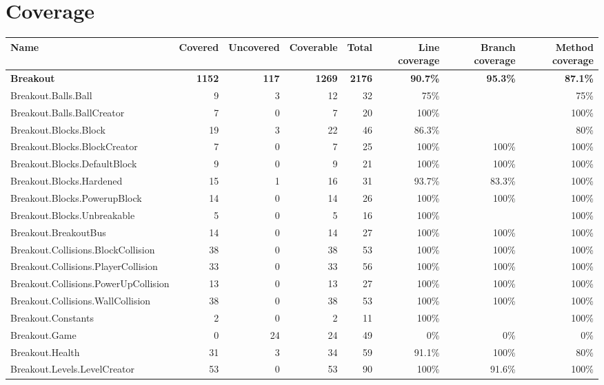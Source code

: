 \documentclass[a4paper,landscape,10pt]{article}
\begin{document}
\section{Coverage}
\begin{longtable}[l]{|l|r|r|r|r|r|r|r|}
\hline
\textbf{Name} & \textbf{Covered} & \textbf{Uncovered} & \textbf{Coverable} & \textbf{Total} & \textbf{Line coverage} & \textbf{Branch coverage} & \textbf{Method coverage}\\
\hline
\textbf{Breakout} & \textbf{1152} & \textbf{117} & \textbf{1269} & \textbf{2176} & \textbf{90.7\%} & \textbf{95.3\%} & \textbf{87.1\%}\\
\hline
Breakout.Balls.Ball & 9 & 3 & 12 & 32 & 75\% &  & 75\%\\
\hline
Breakout.Balls.BallCreator & 7 & 0 & 7 & 20 & 100\% &  & 100\%\\
\hline
Breakout.Blocks.Block & 19 & 3 & 22 & 46 & 86.3\% &  & 80\%\\
\hline
Breakout.Blocks.BlockCreator & 7 & 0 & 7 & 25 & 100\% & 100\% & 100\%\\
\hline
Breakout.Blocks.DefaultBlock & 9 & 0 & 9 & 21 & 100\% & 100\% & 100\%\\
\hline
Breakout.Blocks.Hardened & 15 & 1 & 16 & 31 & 93.7\% & 83.3\% & 100\%\\
\hline
Breakout.Blocks.PowerupBlock & 14 & 0 & 14 & 26 & 100\% & 100\% & 100\%\\
\hline
Breakout.Blocks.Unbreakable & 5 & 0 & 5 & 16 & 100\% &  & 100\%\\
\hline
Breakout.BreakoutBus & 14 & 0 & 14 & 27 & 100\% & 100\% & 100\%\\
\hline
Breakout.Collisions.BlockCollision & 38 & 0 & 38 & 53 & 100\% & 100\% & 100\%\\
\hline
Breakout.Collisions.PlayerCollision & 33 & 0 & 33 & 56 & 100\% & 100\% & 100\%\\
\hline
Breakout.Collisions.PowerUpCollision & 13 & 0 & 13 & 27 & 100\% & 100\% & 100\%\\
\hline
Breakout.Collisions.WallCollision & 38 & 0 & 38 & 53 & 100\% & 100\% & 100\%\\
\hline
Breakout.Constants & 2 & 0 & 2 & 11 & 100\% &  & 100\%\\
\hline
Breakout.Game & 0 & 24 & 24 & 49 & 0\% & 0\% & 0\%\\
\hline
Breakout.Health & 31 & 3 & 34 & 59 & 91.1\% & 100\% & 80\%\\
\hline
Breakout.Levels.LevelCreator & 53 & 0 & 53 & 90 & 100\% & 91.6\% & 100\%\\

\end{longtable}
\end{document}
